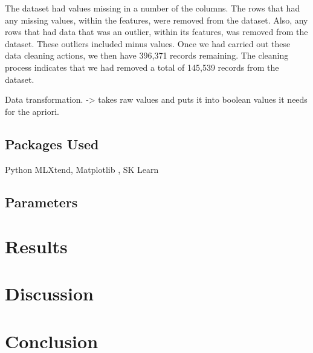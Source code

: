 \documentclass[a4paper,10pt]{article}
\begin{document}
The dataset had values missing in a number of the columns. The rows that had any missing values, within the features, were removed from the dataset. Also, any rows that had data that was an outlier, within its features, was removed from the dataset. These outliers included minus values. Once we had carried out these data cleaning actions, we then have 396,371 records remaining. The cleaning process indicates that we had removed a total of 145,539 records from the dataset. 

Data transformation. -> takes raw values and puts it into boolean values it needs for the apriori.

\subsection{Packages Used}

Python\cite{Python} MLXtend\cite{raschkas_2018_mlxtend}, Matplotlib \cite{hunter2007matplotlib}, SK Learn\cite{scikit-learn, sklearn_api}



\subsection{Parameters}

\section{Results}


\section{Discussion}



\section{Conclusion}



\medskip
\newpage


\end{document}
